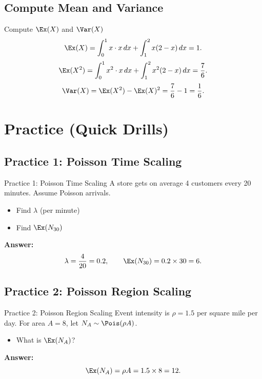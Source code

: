 \documentclass[aspectratio=169]{beamer}
\begin{document}
\subsection{Compute Mean and Variance}
\begin{frame}{Compute \(\Ex(X)\) and \(\Var(X)\)}
  \[
    \Ex(X)=\int_0^1 x\cdot x\,dx + \int_1^2 x(2-x)\,dx = 1.
  \]
  \[
    \Ex(X^2)=\int_0^1 x^2\cdot x\,dx + \int_1^2 x^2(2-x)\,dx = \frac{7}{6}.
  \]
  \[
    \Var(X)=\Ex(X^2)-\Ex(X)^2=\frac{7}{6}-1=\frac{1}{6}.
  \]
\end{frame}

\section{Practice (Quick Drills)}

\subsection{Practice 1: Poisson Time Scaling}
\begin{frame}{Practice 1: Poisson Time Scaling}
  A store gets on average 4 customers every 20 minutes.
  Assume Poisson arrivals.
  \begin{itemize}
    \item Find \(\lambda\) (per minute)
    \item Find \(\Ex(N_{30})\)
  \end{itemize}
  \pause
  \textbf{Answer:}
  \[
    \lambda=\frac{4}{20}=0.2,\qquad \Ex(N_{30})=0.2\times 30=6.
  \]
\end{frame}

\subsection{Practice 2: Poisson Region Scaling}
\begin{frame}{Practice 2: Poisson Region Scaling}
  Event intensity is \(\rho=1.5\) per square mile per day.
  For area \(A=8\), let \(N_A\sim\Pois(\rho A)\).
  \begin{itemize}
    \item What is \(\Ex(N_A)\)?
  \end{itemize}
  \pause
  \textbf{Answer:}
  \[
    \Ex(N_A)=\rho A=1.5\times 8=12.
  \]
\end{frame}
\end{document}
